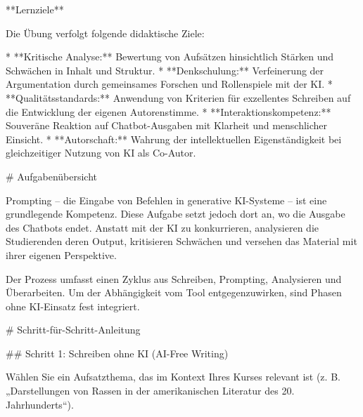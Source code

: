 \documentclass[
  ngerman,
  letterpaper,
  DIV=11]{scrreprt}
\newenvironment{Shaded}{\begin{snugshade}}{\end{snugshade}}
\newcommand{\FunctionTok}[1]{\textcolor[rgb]{0.28,0.35,0.67}{#1}}
\newcommand{\NormalTok}[1]{\textcolor[rgb]{0.00,0.23,0.31}{#1}}
\newcommand{\SpecialStringTok}[1]{\textcolor[rgb]{0.13,0.47,0.30}{#1}}
\begin{document}
\begin{tcolorbox}[enhanced jigsaw, left=2mm, bottomrule=.15mm, arc=.35mm, rightrule=.15mm, colframe=quarto-callout-note-color-frame, coltitle=black, colback=white, toprule=.15mm, toptitle=1mm, colbacktitle=quarto-callout-note-color!10!white, title=\textcolor{quarto-callout-note-color}{\faInfo}\hspace{0.5em}{Tutor-Aufgabe: Sokratischer Dialog}, opacitybacktitle=0.6, leftrule=.75mm, bottomtitle=1mm, titlerule=0mm, opacityback=0, breakable]

\begin{Shaded}
\begin{Highlighting}[]
\NormalTok{**Lernziele**}

\NormalTok{Die Übung verfolgt folgende didaktische Ziele:}

\SpecialStringTok{* }\NormalTok{**Kritische Analyse:** Bewertung von Aufsätzen hinsichtlich Stärken und Schwächen in Inhalt und Struktur.}
\SpecialStringTok{* }\NormalTok{**Denkschulung:** Verfeinerung der Argumentation durch gemeinsames Forschen und Rollenspiele mit der KI.}
\SpecialStringTok{* }\NormalTok{**Qualitätsstandards:** Anwendung von Kriterien für exzellentes Schreiben auf die Entwicklung der eigenen Autorenstimme.}
\SpecialStringTok{* }\NormalTok{**Interaktionskompetenz:** Souveräne Reaktion auf Chatbot{-}Ausgaben mit Klarheit und menschlicher Einsicht.}
\SpecialStringTok{* }\NormalTok{**Autorschaft:** Wahrung der intellektuellen Eigenständigkeit bei gleichzeitiger Nutzung von KI als Co{-}Autor.}

\FunctionTok{\# Aufgabenübersicht}

\NormalTok{Prompting – die Eingabe von Befehlen in generative KI{-}Systeme – ist eine grundlegende Kompetenz. Diese Aufgabe setzt jedoch dort an, wo die Ausgabe des Chatbots endet. Anstatt mit der KI zu konkurrieren, analysieren die Studierenden deren Output, kritisieren Schwächen und versehen das Material mit ihrer eigenen Perspektive.}

\NormalTok{Der Prozess umfasst einen Zyklus aus Schreiben, Prompting, Analysieren und Überarbeiten. Um der Abhängigkeit vom Tool entgegenzuwirken, sind Phasen ohne KI{-}Einsatz fest integriert.}

\FunctionTok{\# Schritt{-}für{-}Schritt{-}Anleitung}

\FunctionTok{\#\# Schritt 1: Schreiben ohne KI (AI{-}Free Writing)}

\NormalTok{Wählen Sie ein Aufsatzthema, das im Kontext Ihres Kurses relevant ist (z. B. „Darstellungen von Rassen in der amerikanischen Literatur des 20. Jahrhunderts“). }


\end{Highlighting}
\end{Shaded}
\end{tcolorbox}
\end{document}
